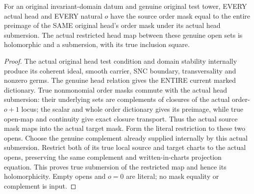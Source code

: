 \begin{theorem}
\label{hir:submersion-historical-masks-order-open}
\leanok
For an original invariant-domain datum and genuine original test tower,
EVERY actual head and EVERY natural $o$ have the source order mask equal to
the entire preimage of the SAME original head's order mask under its actual
head submersion. The actual restricted head map between these genuine open
sets is holomorphic and a submersion, with its true inclusion square.
\end{theorem}
\begin{proof}
The actual original head test condition and domain stability internally
produce its coherent ideal, smooth carrier, SNC boundary, transversality
and nonzero germs. The genuine head relation gives the ENTIRE current
marked dictionary. True nonmonomial order masks commute with the actual
head submersion: their underlying sets are complements of closures of the
actual order-$o+1$ locus; the scalar and whole order dictionary gives its
preimage, while true open-map and continuity give exact closure transport.
Thus the actual source mask maps into the actual target mask. Form the
literal restriction to these two opens. Choose the genuine complement
already supplied internally by this actual submersion. Restrict both of its
true local source and target charts to the actual opens, preserving the
same complement and written-in-charts projection equation. This proves
true submersion of the restricted map and hence its holomorphicity. Empty
opens and $o=0$ are literal; no mask equality or complement is input.
\end{proof}

